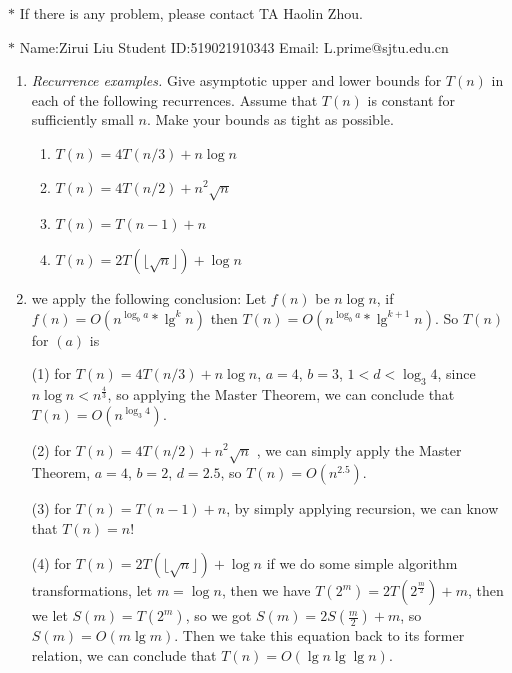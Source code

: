 \documentclass[12pt,a4paper]{article}
\makeatletter
\newtheorem*{solution}{Solution}
\theoremstyle{definition}
\renewenvironment{solution}[1][Solution] {\par\pushQED{\qed}\normalfont\topsep6\p@\@plus6\p@\relax\trivlist\item[\hskip\labelsep\bfseries#1\@addpunct{.}]\ignorespaces}{\popQED\endtrivlist\@endpefalse} \makeatother
\makeatother
\begin{document}
\noindent

\noindent{}
\begin{center}
\footnotesize{\color{red}$*$ If there is any problem, please contact TA Haolin Zhou. }

\footnotesize{\color{blue}$*$ Name:Zirui Liu \quad Student ID:519021910343 \quad Email: L.prime@sjtu.edu.cn}
\end{center}

\begin{enumerate}
\item
    \textit{Recurrence examples.} Give asymptotic upper and lower bounds for $T(n)$ in each of the following recurrences. Assume that $T(n)$ is constant for sufficiently small $n$. Make your bounds as tight as possible.
\begin{enumerate}
	\item $T(n)=4 T(n / 3)+n \log n$
	\item $T(n)=4 T(n / 2)+n^{2} \sqrt{n}$
	\item $T(n)=T(n-1)+n$	
	\item $T(n)=2T(\lfloor \sqrt n\rfloor)+\log n$
\end{enumerate}
\begin{solution}
	we apply the following conclusion: Let $f(n)$ be $n \log n$, if $f(n)=O\left(n^{\log_ b a}*\lg^k n \right)$ then $T(n)=O\left(n^{\log_ b a}*\lg^{k+1} n \right)$. So $T(n)$ for $(a)$ is 

	(1) for $T(n)=4 T(n / 3)+n \log n$, $a=4$, $b=3$, $ 1 < d < \log_3 4 $, since $n\log n < n^{\frac{4}{3}}$, so applying the Master Theorem, we can conclude that $T(n)=O(n^{\log_ 3 4})$.
	
	(2) for $T(n)=4 T(n / 2)+n^{2} \sqrt{n}$ , we can simply apply the Master Theorem, $a=4$, $b=2$, $d=2.5$, so $T(n)=O(n^{2.5})$.
	
	(3) for $T(n)=T(n-1)+n$, by simply applying recursion, we can know that $T\left(n\right)=n!$
	
	(4) for $T(n)=2T(\lfloor \sqrt n\rfloor)+\log n$ if we do some simple algorithm transformations, let $m=\log n$, then we have $T\left(2^m\right)=2T\left(2^{\frac{m}{2}}\right)+m$, then we let $S\left(m\right)=T\left(2^m\right)$, so we got $S\left(m\right)=2S\left(\frac{m}{2}\right)+m$, so $S\left(m\right)=O\left(m\lg m\right)$. Then we take this equation back to its former relation, we can conclude that $T\left(n\right)=O\left(\lg n \lg\lg n\right)$. 
	

\end{solution}
\end{enumerate}
\end{document}
